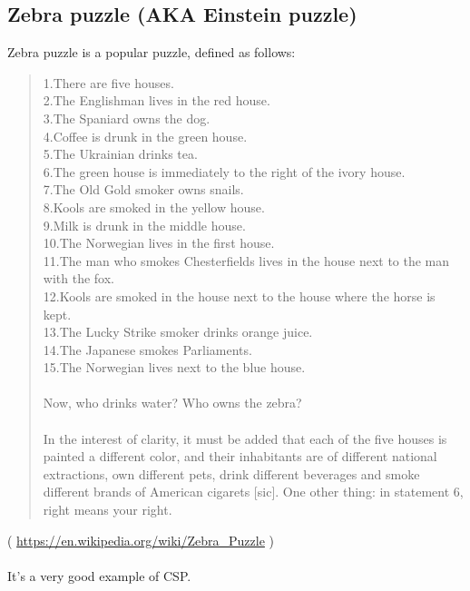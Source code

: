 \subsection{Zebra puzzle (\ac{AKA} Einstein puzzle)}
\label{zebra_SMT}

Zebra puzzle is a popular puzzle, defined as follows:

\begin{framed}
\begin{quotation}
1.There are five houses.\\
2.The Englishman lives in the red house.\\
3.The Spaniard owns the dog.\\
4.Coffee is drunk in the green house.\\
5.The Ukrainian drinks tea.\\
6.The green house is immediately to the right of the ivory house.\\
7.The Old Gold smoker owns snails.\\
8.Kools are smoked in the yellow house.\\
9.Milk is drunk in the middle house.\\
10.The Norwegian lives in the first house.\\
11.The man who smokes Chesterfields lives in the house next to the man with the fox.\\
12.Kools are smoked in the house next to the house where the horse is kept.\\
13.The Lucky Strike smoker drinks orange juice.\\
14.The Japanese smokes Parliaments.\\
15.The Norwegian lives next to the blue house.\\
\\
Now, who drinks water? Who owns the zebra?\\
\\
In the interest of clarity, it must be added that each of the five houses is painted a different color, and their inhabitants are of different national extractions, own different pets, drink different beverages and smoke different brands of American cigarets [sic]. One other thing: in statement 6, right means your right.
\end{quotation}
\end{framed}
( \url{https://en.wikipedia.org/wiki/Zebra_Puzzle} ) \\
\\
It's a very good example of \ac{CSP}.

